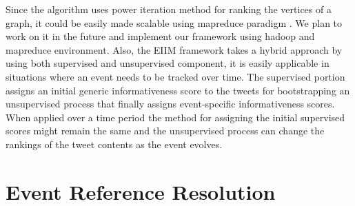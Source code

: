 Since the algorithm uses power iteration method for ranking the vertices of a graph, it could be easily made scalable using mapreduce paradigm \cite{lin2010design}. We plan to work on it in the future and implement our framework using hadoop and mapreduce environment. Also, the EIIM framework takes a hybrid approach by using both supervised and unsupervised component, it is easily applicable in situations where an event needs to be tracked over time. The supervised portion assigns an initial generic informativeness score to the tweets for bootstrapping an unsupervised process that finally assigns event-specific informativeness scores. When applied over a time period the method for assigning the initial supervised scores might remain the same and the unsupervised process can change the rankings of the tweet contents as the event evolves. 


\section{Event Reference Resolution}

